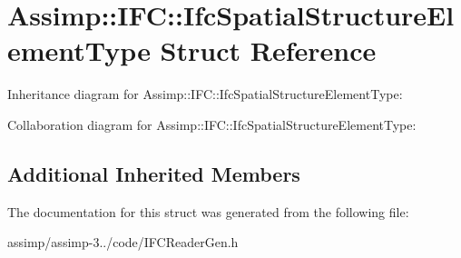 \hypertarget{struct_assimp_1_1_i_f_c_1_1_ifc_spatial_structure_element_type}{\section{Assimp\+:\+:I\+F\+C\+:\+:Ifc\+Spatial\+Structure\+Element\+Type Struct Reference}
\label{struct_assimp_1_1_i_f_c_1_1_ifc_spatial_structure_element_type}
}


Inheritance diagram for Assimp\+:\+:I\+F\+C\+:\+:Ifc\+Spatial\+Structure\+Element\+Type\+:


Collaboration diagram for Assimp\+:\+:I\+F\+C\+:\+:Ifc\+Spatial\+Structure\+Element\+Type\+:
\subsection*{Additional Inherited Members}


The documentation for this struct was generated from the following file\+:\begin{DoxyCompactItemize}
\item 
assimp/assimp-\/3../code/I\+F\+C\+Reader\+Gen.\+h\end{DoxyCompactItemize}
